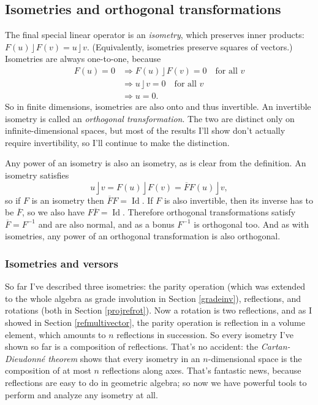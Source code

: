 \documentclass{utarticle}
\newcommand{\Id}{\operatorname{Id}}
\DeclareMathOperator{\lin}{\rfloor}
\newcommand{\adj}[1]{\ensuremath{\overline{#1}}}
\begin{document}
\subsection{Isometries and orthogonal transformations}
\label{orth}

The final special linear operator is an \emph{isometry}, which preserves inner products: 
$F(u) \lin F(v) = u \lin v$.  (Equivalently, isometries preserve squares of vectors.)  Isometries 
are always one-to-one, because
\begin{align}
F(u) = 0 & \Longrightarrow F(u) \lin F(v) = 0 \quad \text{for all $v$} \nonumber \\
               & \Longrightarrow u \lin v = 0 \quad \text{for all $v$} \nonumber \\
               & \Longrightarrow u = 0.
\end{align}
So in finite dimensions, isometries are also onto and thus invertible.  An invertible
isometry is called an \emph{orthogonal transformation}.  The two are distinct only on 
infinite-dimensional spaces, but most of the results I'll show don't actually require invertibility,
so I'll continue to make the distinction.

Any power of an isometry is also an isometry, as is clear from the definition.  An isometry satisfies
\begin{equation} u \lin v = F(u) \lin F(v) = \adj{F}F(u) \lin v, \end{equation}
so if $F$ is an isometry then $\adj{F}F = \Id$.  If $F$ is also invertible, then its inverse has 
to be \adj{F}, so we also have $F\adj{F} = \Id$.  Therefore orthogonal transformations satisfy 
$\adj{F} = F^{-1}$ and are also normal, and as a bonus $F^{-1}$ is orthogonal too.  And as with
isometries, any power of an orthogonal transformation is also orthogonal.

\subsubsection{Isometries and versors}
\label{versors}

So far I've described three isometries: the parity operation (which was extended to the whole 
algebra as grade involution in Section \ref{gradeinv}), reflections, and rotations (both in Section 
\ref{projrefrot}).  Now a rotation is two reflections, and as I showed in Section \ref{refmultivector},
the parity operation is reflection in a volume element, which amounts to $n$ reflections in succession.
So every isometry I've shown so far is a composition of reflections.  That's no accident: the 
\emph{Cartan-Dieudonn\'{e} theorem} shows that every isometry in an $n$-dimensional 
space is the composition of at most $n$ reflections along axes.  That's fantastic news, because
reflections are easy to do in geometric algebra;  so now we have powerful tools to perform
and analyze any isometry at all.
\end{document}
